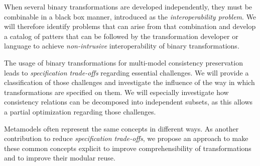 \begin{description}[leftmargin=\parindent]
    \item[Transformation interoperability.] %
        When several binary transformations are developed independently, they must be combinable in a black box manner, introduced as the \emph{interoperability problem}. We will therefore identify problems that can arise from that combination %
        and develop a catalog of patters that can be followed by the transformation developer or language to achieve \emph{non-intrusive} interoperability of binary transformations.
    \item[Decomposition of consistency relations.] 
        The usage of binary transformations for multi-model consistency preservation leads to \emph{specification trade-offs} regarding essential challenges. We will provide a classification of those challenges and investigate the influence of the way in which transformations are specified on them.
        We will especially investigate how consistency relations can be decomposed into independent subsets, as this allows a partial optimization regarding those challenges.
    \item[Make common concepts explicit.] 
        Metamodels often represent the same concepts in different ways. As another contribution to reduce \emph{specification trade-offs}, we propose an approach to make these common concepts explicit to improve comprehensibility of transformations and to improve their modular reuse.
\end{description}


